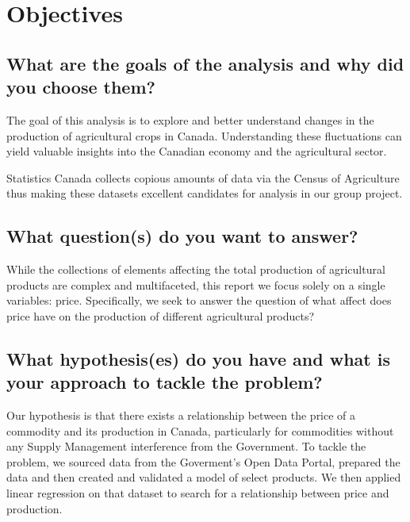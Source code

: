 \section{Objectives}

\subsection{What are the goals of the analysis and why did you choose them?}

The goal of this analysis is to explore and better understand changes in the production of agricultural crops in Canada.
Understanding these fluctuations can yield valuable insights into the Canadian economy and the agricultural sector.

Statistics Canada collects copious amounts of data via the Census of Agriculture~\cite{census} thus making these datasets excellent candidates for analysis in our group project.

\subsection{What question(s) do you want to answer?}

While the collections of elements affecting the total production of agricultural products are complex and multifaceted, this report we focus solely on a single variables: price.
Specifically, we seek to answer the question of what affect does price have on the production of different agricultural products?

\subsection{What hypothesis(es) do you have and what is your approach to tackle the problem?}

Our hypothesis is that there exists a relationship between the price of a commodity and its production in Canada, particularly for commodities without any Supply Management interference from the Government.
To tackle the problem, we sourced data from the Goverment's Open Data Portal, prepared the data and then created and validated a model of select products.
We then applied linear regression on that dataset to search for a relationship between price and production.
